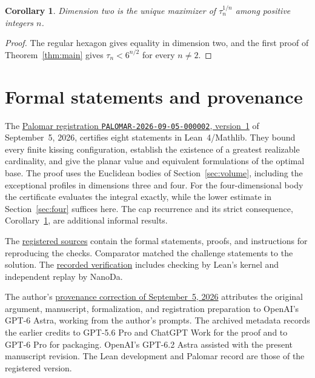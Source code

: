 \documentclass[11pt,a4paper]{article}
\newtheorem{corollary}[theorem]{Corollary}
\theoremstyle{remark}
\begin{document}
\begin{corollary}\label{cor:unique}
Dimension two is the unique maximizer of $\tau_n^{1/n}$ among positive integers $n$.
\end{corollary}

\begin{proof}
The regular hexagon gives equality in dimension two, and the first proof of Theorem~\ref{thm:main} gives $\tau_n<6^{n/2}$ for every $n\ne2$.
\end{proof}

\section{Formal statements and provenance}\label{sec:lean}

The \href{https://palomar-registry.org/entry?id=PALOMAR-2026-09-05-000002&version=1}{Palomar registration \texttt{PALOMAR-2026-09-05-000002}, version~1} of September~5, 2026, certifies eight statements in Lean~4/Mathlib. They bound every finite kissing configuration, establish the existence of a greatest realizable cardinality, and give the planar value and equivalent formulations of the optimal base. The proof uses the Euclidean bodies of Section~\ref{sec:volume}, including the exceptional profiles in dimensions three and four. For the four-dimensional body the certificate evaluates the integral exactly, while the lower estimate in Section~\ref{sec:four} suffices here. The cap recurrence and its strict consequence, Corollary~\ref{cor:unique}, are additional informal results.

The \href{https://github.com/sebastienpalcoux/sqrt6-kissing-bound/tree/cc87870ad897f0fe15e3cdffd3d7acd15f0c1ba9}{registered sources} contain the formal statements, proofs, and instructions for reproducing the checks. Comparator matched the challenge statements to the solution. The \href{https://github.com/PalomarRegistry/PalomarSubmission/actions/runs/33941141603}{recorded verification} includes checking by Lean's kernel and independent replay by NanoDa.

The author's \href{https://github.com/sebastienpalcoux/sqrt6-kissing-bound/commit/508c944c398c6b62b6f93cdbb3a7277554ccbdef}{provenance correction of September~5, 2026} attributes the original argument, manuscript, formalization, and registration preparation to OpenAI's GPT-6 Astra, working from the author's prompts. The archived metadata records the earlier credits to GPT-5.6 Pro and ChatGPT Work for the proof and to GPT-6 Pro for packaging. OpenAI's GPT-6.2 Astra assisted with the present manuscript revision. The Lean development and Palomar record are those of the registered version.
\end{document}
